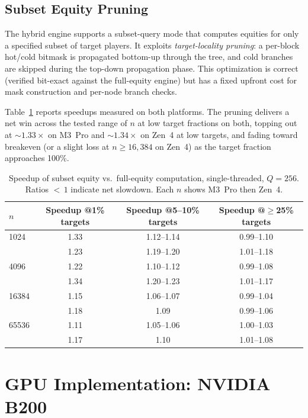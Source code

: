 \documentclass[11pt]{article}
\begin{document}
\subsection{Subset Equity Pruning}\label{sec:subset}

The hybrid engine supports a subset-query mode that computes equities for
only a specified subset of target players. It exploits
\emph{target-locality pruning}: a per-block hot/cold bitmask is propagated
bottom-up through the tree, and cold branches are skipped during the
top-down propagation phase. This optimization is correct (verified
bit-exact against the full-equity engine) but has a fixed upfront cost for
mask construction and per-node branch checks.

Table~\ref{tab:subset} reports speedups measured on both platforms. The
pruning delivers a net win across the tested range of $n$ at low target
fractions on both, topping out at ${\sim}1.33\times$ on M3~Pro and
${\sim}1.34\times$ on Zen~4 at low targets, and fading toward breakeven (or
a slight loss at $n \ge 16{,}384$ on Zen~4) as the target fraction
approaches 100\%.

\begin{table}[t]
\centering
\caption{Speedup of subset equity vs.\ full-equity computation,
  single-threaded, $Q = 256$. Ratios ${<}\,1$ indicate net slowdown.
  Each $n$ shows M3~Pro then Zen~4.}
\label{tab:subset}
\begin{tabular}{@{}l c c c@{}}
\toprule
$n$ & Speedup @1\% targets & Speedup @5--10\% targets & Speedup @$\ge$25\% targets \\
\midrule
1024  & 1.33 & 1.12--1.14 & 0.99--1.10 \\
      & 1.23 & 1.19--1.20 & 1.01--1.18 \\
4096  & 1.22 & 1.10--1.12 & 0.99--1.08 \\
      & 1.34 & 1.20--1.23 & 1.01--1.17 \\
16384 & 1.15 & 1.06--1.07  & 0.99--1.04 \\
      & 1.18 & 1.09        & 0.99--1.06 \\
65536 & 1.11 & 1.05--1.06  & 1.00--1.03 \\
      & 1.17 & 1.10        & 1.01--1.08 \\
\bottomrule
\end{tabular}
\end{table}

\section{GPU Implementation: NVIDIA B200}\label{sec:gpu}
\end{document}
